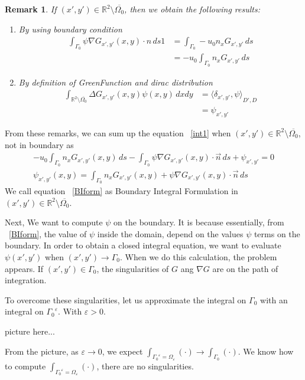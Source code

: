 \documentclass[a4paper,12pt]{article}
\newtheorem{remark}{Remark}
\newcommand{\integ}[3]{%
\ensuremath{\displaystyle{\int^{#2}_{#1} #3}}}
\begin{document}
\begin{remark}
 If $(x',y')\in \mathbb{R}^2 \setminus\overline{\Omega_0}$, then we obtain the following results:
\begin{enumerate}
 \item By using boundary condition
\begin{align}
 \integ{\Gamma_0}{}{\psi \nabla G_{x',y'}(x,y)\cdot n \, ds1}&=\integ{\Gamma_0}{}{-u_0 n_x G_{x',y'} \, ds}\\
&= -u_0 \integ{\Gamma_0}{}{n_x G_{x',y'} \, ds}
\end{align}
\item By definition of GreenFunction and dirac distribution
\begin{align}
 \integ{\mathbb{R}^2 \setminus \overline{\Omega_0}}{}{\Delta G_{x',y'}(x,y) \psi (x,y) \, dxdy}&=
{\langle\delta_{x',y'}{,} \psi\rangle}_{D',D}\\
&=\psi_{x',y'}
\end{align}
\end{enumerate}
\end{remark}
From these remarks, we can sum up the equation ~\eqref{int1} 
when $(x',y')\in \mathbb{R}^2\setminus\overline{\Omega_0}$, not in boundary as
\begin{align}
 -u_0 \integ{\Gamma_0}{}{n_x G_{x',y'}(x,y) \, ds}-
\integ{\Gamma_0}{}{\psi\nabla G_{x',y'}(x,y)\cdot \vec{n} \, ds}+\psi_{x',y'}=0\\
\psi_{x',y'}(x,y)=\integ{\Gamma_0}{}{n_x G_{x',y'}(x,y) +\psi\nabla G_{x',y'}(x,y)\cdot \vec{n} \, ds} \label{BIform}
\end{align}
We call equation ~\eqref{BIform} as Boundary Integral Formulation in $(x',y')\in \mathbb{R}^2\setminus\overline{\Omega_0}$.

Next, We want to compute $\psi$ on the boundary. It is because essentially, from ~\eqref{BIform}, the value of $\psi$ inside the domain, depend on the values 
$\psi$ terms on the boundary. In order to obtain a closed integral equation, we want to evaluate $\psi(x',y')$
when $(x',y')\to \Gamma_0$. When we do this calculation, the problem appears. If $(x',y') \in \Gamma_0$, the singularities of $G$ ang $\nabla G$ are on the path 
of integration.

To overcome these singularities, let us approximate the integral on $\Gamma_0$ with an integral on ${\Gamma_0}^\varepsilon$.
With $\varepsilon >0$.

picture here...

From the picture, as $\varepsilon\to0$, we expect $\integ{{\Gamma_0}^\varepsilon=\Omega_\varepsilon}{}{(\cdot)} \to \integ{\Gamma_0}{}{(\cdot)}$.
We know how to compute $\integ{{\Gamma_0}^\varepsilon=\Omega_\varepsilon}{}{(\cdot)}$, there are no singularities.
\end{document}

